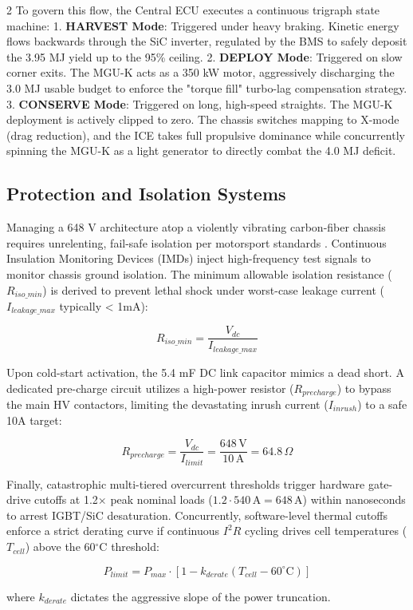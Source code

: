 \begin{multicols}{2}
To govern this flow, the Central ECU executes a continuous trigraph state machine:
1. \textbf{HARVEST Mode}: Triggered under heavy braking. Kinetic energy flows backwards through the SiC inverter, regulated by the BMS to safely deposit the 3.95 MJ yield up to the 95\% ceiling.
2. \textbf{DEPLOY Mode}: Triggered on slow corner exits. The MGU-K acts as a 350 kW motor, aggressively discharging the 3.0 MJ usable budget to enforce the "torque fill" turbo-lag compensation strategy.
3. \textbf{CONSERVE Mode}: Triggered on long, high-speed straights. The MGU-K deployment is actively clipped to zero. The chassis switches mapping to X-mode (drag reduction), and the ICE takes full propulsive dominance while concurrently spinning the MGU-K as a light generator to directly combat the 4.0 MJ deficit.

\subsection{Protection and Isolation Systems}

Managing a 648 V architecture atop a violently vibrating carbon-fiber chassis requires unrelenting, fail-safe isolation per motorsport standards \cite{FIA_2026_Technical_Regulations}. Continuous Insulation Monitoring Devices (IMDs) inject high-frequency test signals to monitor chassis ground isolation. The minimum allowable isolation resistance ($R_{iso\_min}$) is derived to prevent lethal shock under worst-case leakage current ($I_{leakage\_max}$ typically < 1mA):

\begin{equation} \label{eq:isolation_res}
R_{iso\_min} = \frac{V_{dc}}{I_{leakage\_max}}
\end{equation}

Upon cold-start activation, the 5.4 mF DC link capacitor mimics a dead short. A dedicated pre-charge circuit utilizes a high-power resistor ($R_{precharge}$) to bypass the main HV contactors, limiting the devastating inrush current ($I_{inrush}$) to a safe 10A target:

\begin{equation} \label{eq:precharge_res}
R_{precharge} = \frac{V_{dc}}{I_{limit}} = \frac{648\,\mathrm{V}}{10\,\mathrm{A}} = 64.8\,\Omega
\end{equation}

Finally, catastrophic multi-tiered overcurrent thresholds trigger hardware gate-drive cutoffs at 1.2$\times$ peak nominal loads ($1.2 \cdot 540\,\mathrm{A} = 648\,\mathrm{A}$) within nanoseconds to arrest IGBT/SiC desaturation. Concurrently, software-level thermal cutoffs enforce a strict derating curve if continuous $I^2R$ cycling drives cell temperatures ($T_{cell}$) above the 60$^\circ$C threshold:

\begin{equation} \label{eq:thermal_derate}
P_{limit} = P_{max} \cdot \left[ 1 - k_{derate} (T_{cell} - 60^\circ\mathrm{C}) \right]
\end{equation}

where $k_{derate}$ dictates the aggressive slope of the power truncation.
\end{multicols}
